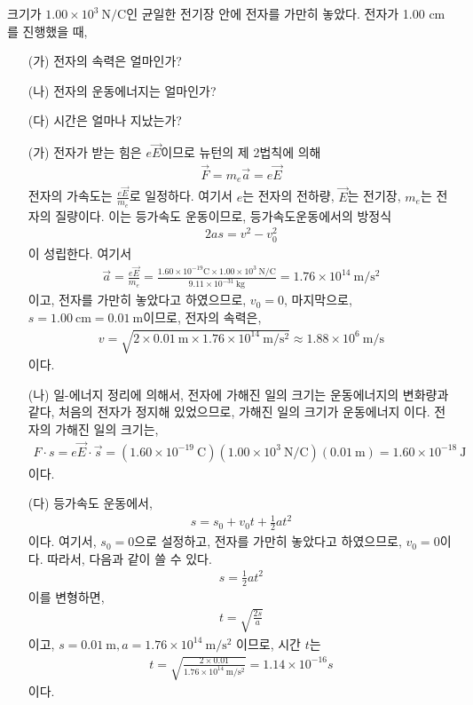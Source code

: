 \documentclass[tightenlines,floatfix,nofootinbib,superscriptaddress,fleqn]{revtex4}
\begin{document}
크기가 $1.00\times 10^3~\mathrm{N/C}$인 균일한
전기장 안에 전자를 가만히 놓았다. 전자가 1.00 cm를 진행했을 때,
\begin{itemize}
\item[(가)] 전자의 속력은 얼마인가? 
\item[(나)] 전자의 운동에너지는 얼마인가? 
\item[(다)] 시간은 얼마나 지났는가? 
\end{itemize}
\vspace{1.cm}
\begin{itemize}
\item[(가)] 전자가 받는 힘은 $e\vec{E}$이므로 뉴턴의 제 2법칙에 의해
\begin{align}
  \vec{F}=m_e\vec{a}=e\vec{E}
\end{align}
전자의 가속도는 $\frac{e\vec{E}}{m_e}$로 일정하다.
여기서 $e$는 전자의 전하량, $\vec{E}$는 전기장, $m_e$는 전자의 질량이다.
이는 등가속도 운동이므로, 등가속도운동에서의 방정식 
\begin{align}
  2as=v^2-v_0^2
\end{align}
이 성립한다. 여기서 
\begin{align}
  \vec{a}=\frac{e\vec{E}}{m_e}=\frac{1.60 \times 10^{-19}\mathrm{C} \times 1.00 \times 10^3~\mathrm{N/C}}{9.11\times10^{-31}~\mathrm{kg}}=1.76\times10^{14}~\mathrm{m/s^2}
\end{align}
이고, 전자를 가만히 놓았다고 하였으므로, $v_0=0$, 마지막으로, $s=1.00~\mathrm{cm}=0.01~\mathrm{m}$이므로,
전자의 속력은,
\begin{align}
  v=\sqrt{2\times0.01~\mathrm{m}\times1.76\times10^{14}~\mathrm{m/s^2}}\approx1.88\times10^6~\mathrm{m/s}
\end{align}
이다.
\item[(나)] 
일-에너지 정리에 의해서, 전자에 가해진 일의 크기는 운동에너지의 변화량과 같다,
처음의 전자가 정지해 있었으므로, 가해진 일의 크기가 운동에너지 이다.
전자의 가해진 일의 크기는,
\begin{align}
  F\cdot s=e\vec{E}\cdot \vec{s}=(1.60\times10^{-19}~\mathrm{C})(1.00\times10^3~\mathrm{N/C}) (0.01~\mathrm{m})=1.60\times 10^{-18}~\mathrm{J}
\end{align}
이다.
\item[(다)]
등가속도 운동에서,
\begin{align}
  s=s_0+v_0t+\frac{1}{2}at^2
\end{align}
이다. 여기서, $s_0=0$으로 설정하고, 전자를 가만히 놓았다고 하였으므로, $v_0=0$이다.
따라서, 다음과 같이 쓸 수 있다.
\begin{align}
  s=\frac{1}{2}at^2
\end{align}
이를 변형하면,
\begin{align}
  t=\sqrt{\frac{2s}{a}}
\end{align}
이고, $s=0.01~\mathrm{m}, a=1.76\times10^{14}~\mathrm{m/s^2}$
이므로, 시간 $t$는
\begin{align}
  t=\sqrt{\frac{2\times0.01}{1.76\times10^{14}~\mathrm{m/s^2}}}=1.14\times10^{-16}s
\end{align}
이다.
\end{itemize}
\vspace{1.cm}
\end{document}

